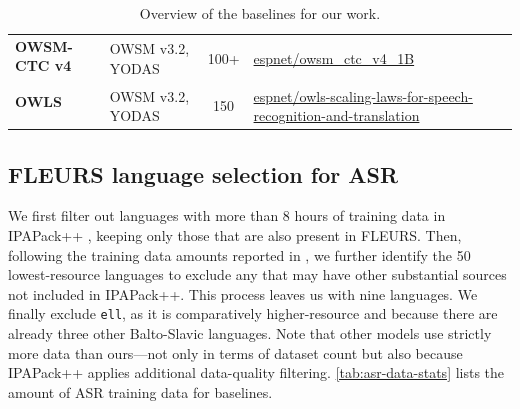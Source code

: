 \begin{table}[t]
{\begin{tabular}{ll c l}
\textbf{OWSM-CTC v4} & \multirow{2}{*}{OWSM v3.2, YODAS} & \multirow{2}{*}{100+} &\multirow{2}{*}{{\href{https://huggingface.co/espnet/owsm_ctc_v4_1B}{espnet/owsm\_ctc\_v4\_1B}}}\\
\cite{peng25c_interspeech} \\
\addlinespace[0.15cm]

\textbf{OWLS} & \multirow{2}{*}{OWSM v3.2, YODAS} & \multirow{2}{*}{150} &\multirow{2}{*}{{\href{https://huggingface.co/collections/espnet/owls-scaling-laws-for-speech-recognition-and-translation-67ab7f991c194065f057ce8d}{espnet/owls-scaling-laws-for-speech-recognition-and-translation}}}\\
\cite{chen2025owls}\\

\bottomrule
\end{tabular}
}
\caption{Overview of the baselines for our work.}
\label{tab:training-data-summary}
\end{table}


\subsection{FLEURS language selection for ASR}
\label{sec:appendix-asr-splits}
We first filter out languages with more than 8 hours of training data in IPAPack++ \cite{zhu-etal-2025-zipa}, keeping only those that are also present in FLEURS.
Then, following the training data amounts reported in \citet{chen2025owls}, we further identify the 50 lowest-resource languages to exclude any that may have other substantial sources not included in IPAPack++.
This process leaves us with nine languages. We finally exclude \texttt{ell}, as it is comparatively higher-resource and because there are already three other Balto-Slavic languages.
Note that other models use strictly more data than ours---not only in terms of dataset count but also because IPAPack++ applies additional data-quality filtering. \autoref{tab:asr-data-stats} lists the amount of ASR training data for baselines.

